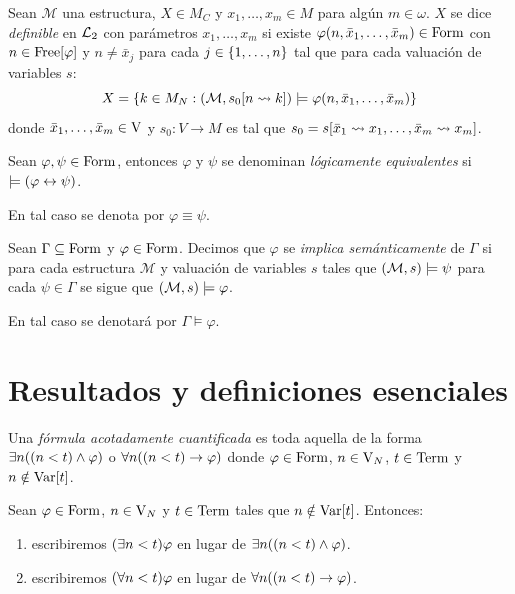 \begin{definition}[Definibilidad]
	Sean $\mathcal{M}$ una estructura, $X\in M_{C}$ y $x_{1},\dotsc, x_{m}\in M$ para algún $m\in\omega$. $X$ se dice \emph{definible} en $\ARITMETICA$ con parámetros $x_{1},\dotsc, x_{m}$ si existe $\varphi\pa*{n,\bar{x}_{1},\dotsc,\bar{x}_{m}}\in\FORMULAS$ con $n\in\LIBRESDE{\varphi}$ y $n\neq\bar{x}_{j}$ para cada $j\in\set*{1,\dotsc, n}$ tal que para cada valuación de variables $s$:
	\[
		X =\set*{k\in M_{N}:\pa*{\mathcal{M}, s_{0}\bra*{n\leadsto k}}\models\varphi\pa*{n,\bar{x}_{1},\dotsc,\bar{x}_{m}}}
	\]
	donde $\bar{x}_{1},\dotsc,\bar{x}_{m}\in\VARIABLES$ y $s_{0}: V\to M$ es tal que $s_{0} = s\bra*{\bar{x}_{1}\leadsto x_{1},\dotsc,\bar{x}_{m}\leadsto x_{m}}$.
\end{definition}

\begin{definition}
	Sean $\varphi,\psi\in\FORMULAS$, entonces $\varphi$ y $\psi$ se denominan \emph{lógicamente equivalentes} si $\models\pa*{\varphi\leftrightarrow\psi}$.

	En tal caso se denota por $\varphi\equiv\psi$.
\end{definition}

\begin{definition}
	Sean $\Gamma\subseteq\FORMULAS$ y $\varphi\in\FORMULAS$. Decimos que $\varphi$ se \emph{implica semánticamente} de $\Gamma$ si para cada estructura $\mathcal{M}$ y valuación de variables $s$ tales que $\pa*{\mathcal{M}, s}\models\psi$ para cada $\psi\in\Gamma$ se sigue que $\pa*{\mathcal{M}, s}\models\varphi$.

	En tal caso se denotará por $\Gamma\models\varphi$.
\end{definition}

\section{Resultados y definiciones esenciales}

\begin{definition}
	Una \emph{fórmula acotadamente cuantificada} es toda aquella de la forma $\exists n\pa*{\pa*{n < t}\land\varphi}$ o $\forall n\pa*{\pa*{n < t}\to\varphi}$ donde $\varphi\in\FORMULAS$, $n\in\VARIABLES[N]$, $t\in\TERMINOS$ y $n\notin\mathrm{Var}\bra*{t}$.
\end{definition}

\begin{notation}
	Sean $\varphi\in\FORMULAS$, $n\in\VARIABLES[N]$ y $t\in\TERMINOS$ tales que $n\notin\mathrm{Var}\bra*{t}$. Entonces:

	\begin{enumerate}
		\item escribiremos $\pa*{\exists n < t}\varphi$ en lugar de $\exists n\pa*{\pa*{n < t}\land\varphi}$.
		\item escribiremos $\pa*{\forall n < t}\varphi$ en lugar de $\forall n\pa*{\pa*{n < t}\to\varphi}$.
	\end{enumerate}
\end{notation}

